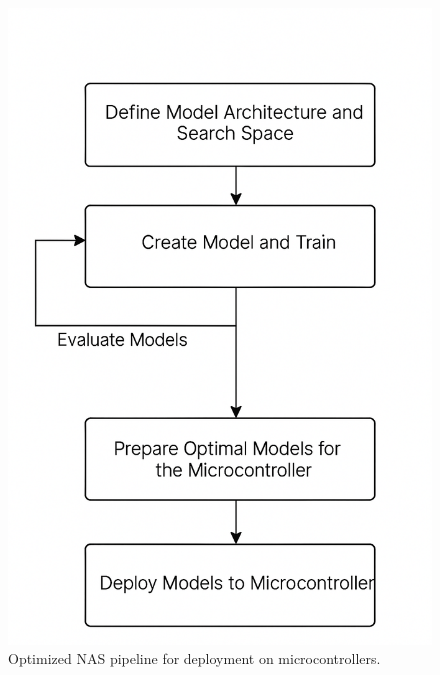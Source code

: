 \begin{figure}[ht]
    \centering
    \includegraphics[width=0.6\linewidth]{Pictures/NewMethodology.png}
    \caption{Optimized NAS pipeline for deployment on microcontrollers.}
    \label{fig:workflow_optimization}
\end{figure}



